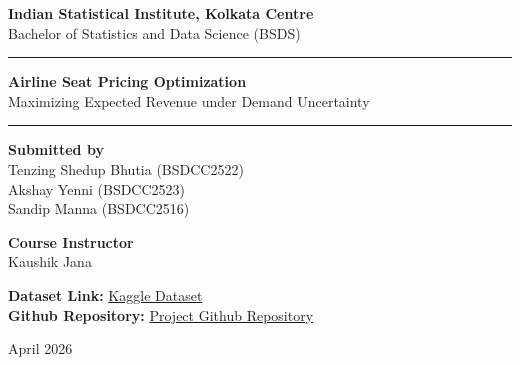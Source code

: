 \documentclass[12pt]{article}
\begin{document}
\begin{titlepage}
\centering

{\Large \textbf{Indian Statistical Institute, Kolkata Centre}}\\[0.4cm]
{\Large Bachelor of Statistics and Data Science (BSDS)}\\[1cm]

\hrule
\vspace{1cm}

{\Huge \textbf{Airline Seat Pricing Optimization}}\\[0.3cm]
{\Large Maximizing Expected Revenue under Demand Uncertainty}\\[1cm]

\hrule
\vspace{1.5cm}

\begin{center}
\textbf{Submitted by} \\
Tenzing Shedup Bhutia (BSDCC2522) \\
 Akshay Yenni (BSDCC2523) \\
Sandip Manna (BSDCC2516)
\end{center}

\vspace{1cm}

\begin{center}
\textbf{Course Instructor} \\
Kaushik Jana
\end{center}

\vspace{1cm}

\begin{center}
\textbf{Dataset Link:} \href{https://www.kaggle.com/datasets/umerabbasi658/data-train-xlsx?resource=download}{Kaggle Dataset} \\[0.2cm]
\textbf{Github Repository: } \href{https://github.com/sandip743357mannasandip-bot/AIRLINE-TICKET-PRICING-OPTIMIZATION-}{Project Github Repository} \\[0.2cm]

\end{center}

\vfill

{\large April 2026}

\end{titlepage}

\newpage

\begin{abstract}
This project studies airline ticket pricing using statistical modeling and optimization techniques under uncertain demand. Using historical flight data, relationships between ticket prices and influencing factors are analyzed and incorporated into a revenue-maximizing framework. The study follows the PPDAC cycle to ensure a structured and data-driven approach.
\end{abstract}
\end{document}
